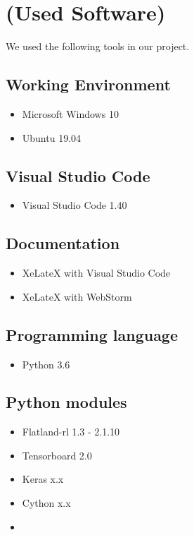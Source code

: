 \section{(Used Software)}\label{software}
We used the following tools in our project.

\subsection*{Working Environment}\label{os}
\begin{itemize}
	\item Microsoft Windows 10
	\item Ubuntu 19.04
\end{itemize}

\subsection*{Visual Studio Code}\label{vsc}
\begin{itemize}
	\item Visual Studio Code 1.40
\end{itemize}

\subsection*{Documentation}\label{dokutools}
\begin{itemize}
	\item XeLateX with Visual Studio Code
	\item XeLateX with WebStorm
\end{itemize}


\subsection*{Programming language}\label{programminglanguages}
\begin{itemize}
	\item Python 3.6
\end{itemize}

\subsection*{Python modules}\label{modules}
\begin{itemize}
	\item Flatland-rl 1.3 - 2.1.10
	\item Tensorboard 2.0
	\item Keras x.x
	\item Cython x.x
	\item %
\end{itemize}


